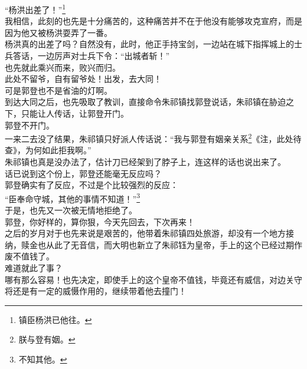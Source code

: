 \begin{multicols}{\theparacolNo}
“杨洪出差了！”\footnote{镇臣杨洪已他往。}\\

我相信，此刻的也先是十分痛苦的，这种痛苦并不在于他没有能够攻克宣府，而是因为他又被杨洪耍弄了一番。\\

杨洪真的出差了吗？自然没有，此时，他正手持宝剑，一边站在城下指挥城上的士兵答话，一边厉声对士兵下令：“出城者斩！”\\

也先就此乘兴而来，败兴而归。\\

此处不留爷，自有留爷处！出发，去大同！\\

可是郭登也不是省油的灯啊。\\

到达大同之后，也先吸取了教训，直接命令朱祁镇找郭登说话，朱祁镇在胁迫之下，只能让人传话，让郭登开门。\\

郭登不开门。\\

一来二去没了结果，朱祁镇只好派人传话说：“我与郭登有姻亲关系\footnote{朕与登有姻。}《注，此处待查》，为何如此拒我啊。”\\

朱祁镇也真是没办法了，估计刀已经架到了脖子上，连这样的话也说出来了。\\

话已说到这个份上，郭登还能毫无反应吗？\\

郭登确实有了反应，不过是个比较强烈的反应：\\

“臣奉命守城，其他的事情不知道！”\footnote{不知其他。}\\

于是，也先又一次被无情地拒绝了。\\

郭登，你好样的，算你狠，今天先回去，下次再来！\\

之后的岁月对于也先来说是艰苦的，他带着朱祁镇四处旅游，却没有一个地方接纳，赎金也从此了无音信，而大明也新立了朱祁钰为皇帝，手上的这个已经过期作废不值钱了。\\

难道就此了事？\\

哪有那么容易！也先决定，即使手上的这个皇帝不值钱，毕竟还有威信，对边关守将还是有一定的威慑作用的，继续带着他去撞门！\\


\end{multicols}
